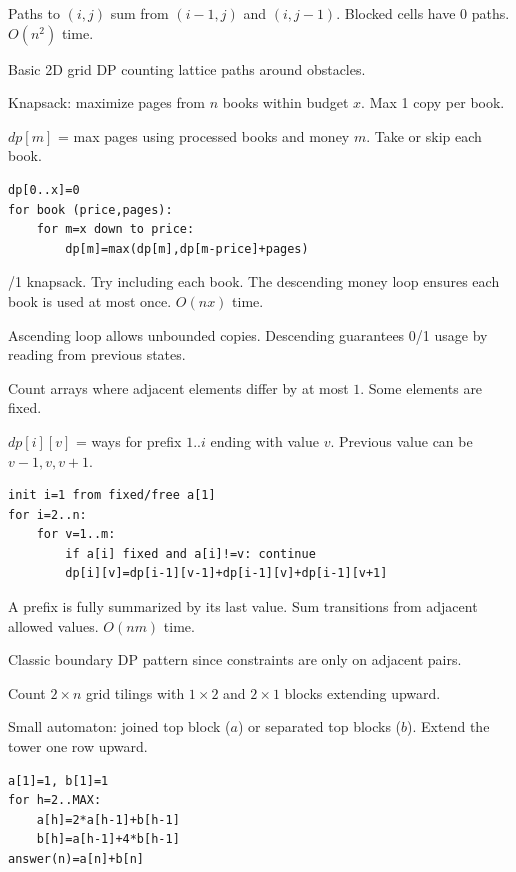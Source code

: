 \Solution Paths to $(i,j)$ sum from $(i-1,j)$ and $(i,j-1)$. Blocked cells have 0 paths. $O(n^2)$ time.

\Analysis Basic 2D grid DP counting lattice paths around obstacles.


\Problem Knapsack: maximize pages from $n$ books within budget $x$. Max 1 copy per book.

\State $dp[m]$ = max pages using processed books and money $m$.
\Trans Take or skip each book.
\begin{lstlisting}
dp[0..x]=0
for book (price,pages):
    for m=x down to price:
        dp[m]=max(dp[m],dp[m-price]+pages)
\end{lstlisting}

/1 knapsack. Try including each book. The descending money loop ensures each book is used at most once. $O(nx)$ time.

\Analysis Ascending loop allows unbounded copies. Descending guarantees 0/1 usage by reading from previous states.


\Problem Count arrays where adjacent elements differ by at most $1$. Some elements are fixed.

\State $dp[i][v]$ = ways for prefix $1..i$ ending with value $v$.
\Trans Previous value can be $v-1,v,v+1$.
\begin{lstlisting}
init i=1 from fixed/free a[1]
for i=2..n:
    for v=1..m:
        if a[i] fixed and a[i]!=v: continue
        dp[i][v]=dp[i-1][v-1]+dp[i-1][v]+dp[i-1][v+1]
\end{lstlisting}

\Solution A prefix is fully summarized by its last value. Sum transitions from adjacent allowed values. $O(nm)$ time.

\Analysis Classic boundary DP pattern since constraints are only on adjacent pairs.


\Problem Count $2 \times n$ grid tilings with $1 \times 2$ and $2 \times 1$ blocks extending upward.

\State Small automaton: joined top block ($a$) or separated top blocks ($b$).
\Trans Extend the tower one row upward.
\begin{lstlisting}
a[1]=1, b[1]=1
for h=2..MAX:
    a[h]=2*a[h-1]+b[h-1]
    b[h]=a[h-1]+4*b[h-1]
answer(n)=a[n]+b[n]
\end{lstlisting}

